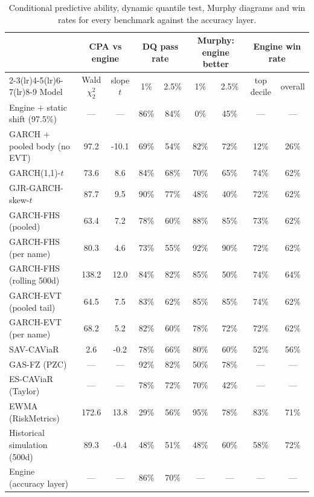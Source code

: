 \documentclass[11pt]{article}
\begin{document}
\begin{table}[htbp]
\centering
\begin{threeparttable}
\caption{Conditional predictive ability, dynamic quantile test, Murphy diagrams and win rates for every benchmark against the accuracy layer.}
\label{tab:bench-tests}
\footnotesize
\begin{tabular}{lcccccccc}
\toprule
& \multicolumn{2}{c}{CPA vs engine} & \multicolumn{2}{c}{DQ pass rate} & \multicolumn{2}{c}{Murphy: engine better} & \multicolumn{2}{c}{Engine win rate} \\
\cmidrule(lr){2-3}\cmidrule(lr){4-5}\cmidrule(lr){6-7}\cmidrule(lr){8-9}
Model & Wald $\chi^2_2$ & slope $t$ & 1\% & 2.5\% & 1\% & 2.5\% & top decile & overall \\
\midrule
Engine $+$ static shift (97.5\%) & --- & --- & 86\% & 84\% & 0\% & 45\% & --- & --- \\
GARCH $+$ pooled body (no EVT) & 97.2 & -10.1 & 69\% & 54\% & 82\% & 72\% & 12\% & 26\% \\
GARCH(1,1)-$t$ & 73.6 & 8.6 & 84\% & 68\% & 70\% & 65\% & 74\% & 62\% \\
GJR-GARCH-skew-$t$ & 87.7 & 9.5 & 90\% & 77\% & 48\% & 40\% & 72\% & 62\% \\
GARCH-FHS (pooled) & 63.4 & 7.2 & 78\% & 60\% & 88\% & 85\% & 73\% & 62\% \\
GARCH-FHS (per name) & 80.3 & 4.6 & 73\% & 55\% & 92\% & 90\% & 72\% & 62\% \\
GARCH-FHS (rolling 500d) & 138.2 & 12.0 & 84\% & 82\% & 85\% & 50\% & 74\% & 64\% \\
GARCH-EVT (pooled tail) & 64.5 & 7.5 & 83\% & 62\% & 85\% & 85\% & 74\% & 62\% \\
GARCH-EVT (per name) & 68.2 & 5.2 & 82\% & 60\% & 78\% & 72\% & 72\% & 62\% \\
SAV-CAViaR & 2.6 & -0.2 & 78\% & 66\% & 80\% & 60\% & 52\% & 56\% \\
GAS-FZ (PZC) & --- & --- & 92\% & 82\% & 50\% & 78\% & --- & --- \\
ES-CAViaR (Taylor) & --- & --- & 78\% & 72\% & 70\% & 42\% & --- & --- \\
EWMA (RiskMetrics) & 172.6 & 13.8 & 29\% & 56\% & 95\% & 78\% & 83\% & 71\% \\
Historical simulation (500d) & 89.3 & -0.4 & 48\% & 51\% & 48\% & 60\% & 58\% & 72\% \\
\midrule
Engine (accuracy layer) & --- & --- & 86\% & 70\% & --- & --- & --- & --- \\
\bottomrule

\end{tabular}
\end{threeparttable}
\end{table}
\end{document}
